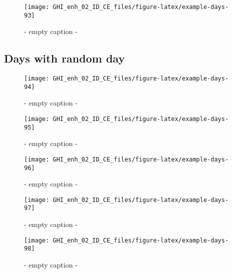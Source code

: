 \documentclass[
  10pt,
  a4paper,oneside]{article}
\begin{document}
\begin{figure}[H]

{\centering \texttt{[image: GHI\_enh\_02\_ID\_CE\_files/figure-latex/example-days-93]} 

}

\caption{ - empty caption - }\label{fig:example-days-93}
\end{figure}

\FloatBarrier

\hypertarget{days-with-random-day}{%
\subsection{Days with random day}\label{days-with-random-day}}

\begin{figure}[H]

{\centering \texttt{[image: GHI\_enh\_02\_ID\_CE\_files/figure-latex/example-days-94]} 

}

\caption{ - empty caption - }\label{fig:example-days-94}
\end{figure}

\begin{figure}[H]

{\centering \texttt{[image: GHI\_enh\_02\_ID\_CE\_files/figure-latex/example-days-95]} 

}

\caption{ - empty caption - }\label{fig:example-days-95}
\end{figure}

\begin{figure}[H]

{\centering \texttt{[image: GHI\_enh\_02\_ID\_CE\_files/figure-latex/example-days-96]} 

}

\caption{ - empty caption - }\label{fig:example-days-96}
\end{figure}

\begin{figure}[H]

{\centering \texttt{[image: GHI\_enh\_02\_ID\_CE\_files/figure-latex/example-days-97]} 

}

\caption{ - empty caption - }\label{fig:example-days-97}
\end{figure}

\begin{figure}[H]

{\centering \texttt{[image: GHI\_enh\_02\_ID\_CE\_files/figure-latex/example-days-98]} 

}

\caption{ - empty caption - }\label{fig:example-days-98}
\end{figure}
\end{document}
